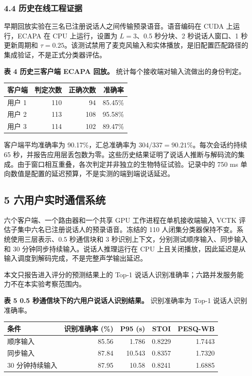 \documentclass[12pt]{article}
\newcounter{none}
\begin{document}
\subsubsection{4.4
历史在线工程证据}\label{ux5386ux53f2ux5728ux7ebfux5de5ux7a0bux8bc1ux636e}

早期回放实验在三名已注册说话人之间传输预录语音。语音编码在
CUDA 上运行，ECAPA 在 CPU 上运行，设置为 \(L=3\)、0.5 秒分块、2
秒说话人窗口、1 秒更新周期和
\(\tau=0.25\)。该测试禁用了麦克风输入和实体播放，是旧配置匹配路径的集成验证，不是正式分类器评估。

\textbf{表 4 历史三客户端 ECAPA 回放。}
统计每个接收端对输入流做出的身份判定。

{\def\LTcaptype{none} %
\begin{longtable}[]{@{}lrrr@{}}
\toprule\noalign{}
客户端 & 判定次数 & 正确次数 & 准确率 \\
\midrule\noalign{}
\endhead
\bottomrule\noalign{}
\endlastfoot
用户 1 & 110 & 94 & 85.45\% \\
用户 2 & 113 & 108 & 95.58\% \\
用户 3 & 114 & 102 & 89.47\% \\
\end{longtable}
}

客户端平均准确率为 90.17\%，汇总准确率为
\(304/337=90.21\%\)。每次会话约持续 65
秒，并报告应用层丢包数为零。这些历史结果证明了说话人推断与解码流的集成。由于窗口相互重叠，各次判定并非独立的生物特征试验。记录中的
750 ms 单向数值是配置的延迟预算，不是实测的端到端说话延迟。

\subsection{5 六用户实时通信系统}\label{six-user-integration-zh}

六个客户端、一个路由器和一个共享 GPU 工作进程在单机接收端输入 VCTK 评估子集中六名已注册说话人的预录语音。冻结的 110 人闭集分类器保持不变。系统使用三层表示、0.5 秒通信块和 3 秒识别上下文，分别测试顺序输入、同步输入和 30 分钟同步持续输入。说话人推理运行在 CPU 上且关闭播放，因此延迟是从输入调度到解码完成，不是完整声学输出延迟。

本文只报告进入评分的预测结果上的 Top-1 说话人识别准确率；六路并发服务能力不在本实验考察范围内。

\textbf{表 5 0.5 秒通信块下的六用户说话人识别结果。} 识别准确率为 Top-1 说话人识别准确率。

\begingroup
\scriptsize
\setlength{\tabcolsep}{3pt}
{\def\LTcaptype{none} %
\begin{longtable}[]{@{}lrrrr@{}}
\toprule\noalign{}
条件 & 识别准确率 (\%) & P95 (s) & STOI & PESQ-WB \\
\midrule\noalign{}
\endhead
\bottomrule\noalign{}
\endlastfoot
顺序输入 & 85.56 & 1.786 & 0.8229 & 1.7443 \\
同步输入 & 87.84 & 10.543 & 0.8357 & 1.7320 \\
30 分钟持续输入 & 87.95 & 10.58 & 0.8241 & 1.6885 \\
\end{longtable}
}
\endgroup
\end{document}
